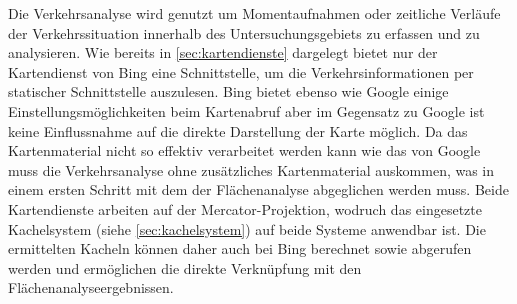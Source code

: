 Die Verkehrsanalyse wird genutzt um Momentaufnahmen oder zeitliche Verläufe der Verkehrssituation innerhalb des Untersuchungsgebiets zu erfassen und zu analysieren. Wie bereits in \ref{sec:kartendienste} dargelegt bietet nur der Kartendienst von Bing eine Schnittstelle, um die Verkehrsinformationen per statischer Schnittstelle auszulesen. Bing bietet ebenso wie Google einige Einstellungsmöglichkeiten beim Kartenabruf aber im Gegensatz zu Google ist keine Einflussnahme auf die direkte Darstellung der Karte möglich. Da das Kartenmaterial nicht so effektiv verarbeitet werden kann wie das von Google muss die Verkehrsanalyse ohne zusätzliches Kartenmaterial auskommen, was in einem ersten Schritt mit dem der Flächenanalyse abgeglichen werden muss. Beide Kartendienste arbeiten auf der Mercator-Projektion, wodruch das eingesetzte Kachelsystem (siehe \ref{sec:kachelsystem}) auf beide Systeme anwendbar ist. Die ermittelten Kacheln können daher auch bei Bing berechnet sowie abgerufen werden und ermöglichen die direkte Verknüpfung mit den Flächenanalyseergebnissen.



